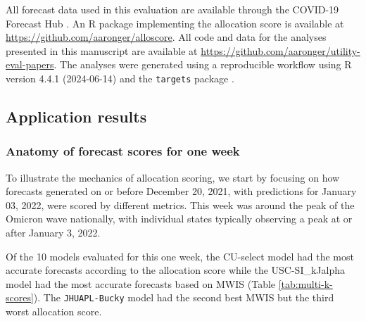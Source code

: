 \documentclass{article}\usepackage[]{graphicx}\usepackage[]{xcolor}
\begin{document}
All forecast data used in this evaluation are available through the COVID-19 Forecast Hub \citep{cramer_united_2022}. An
R package implementing the allocation score is available at \url{https://github.com/aaronger/alloscore}. All code and
data for the analyses presented in this manuscript are available at
\url{https://github.com/aaronger/utility-eval-papers}. The analyses were generated using a reproducible workflow using
R version 4.4.1 (2024-06-14) and the {\tt targets} package \citep{Rcore-2023, landau_2021_targets}.

\subsection{Application results}







\subsubsection{Anatomy of forecast scores for one week}

To illustrate the mechanics of allocation scoring, we start by focusing on how forecasts generated on or before December
20, 2021, with predictions for January 03, 2022, were scored by different metrics. This week was around the peak of the
Omicron wave nationally, with individual states typically observing a peak at or after January 3, 2022.

Of the 10 models evaluated for this one week, the CU-select model had the most accurate forecasts according to the
allocation score while the USC-SI\_kJalpha model had the most accurate forecasts based on MWIS (Table
\ref{tab:multi-k-scores}). The \texttt{JHUAPL-Bucky} model had the second best MWIS but the third worst allocation score.
\end{document}
